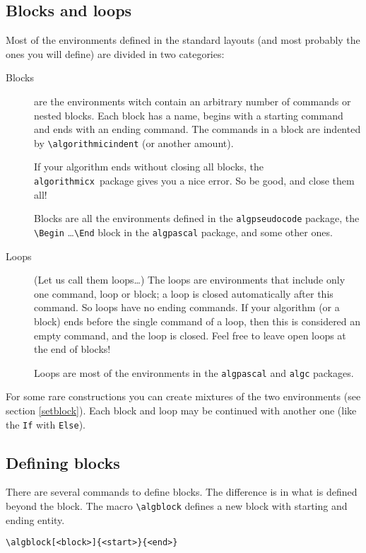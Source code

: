 \documentclass{article}
\newcommand{\alg}{\texttt{algorithmicx}}
\begin{document}
\begin{minipage}[b]{0.5\linewidth}
\begin{minipage}[b]{0.5\linewidth}
\begin{minipage}[b]{0.5\linewidth}
\begin{minipage}[b]{0.5\linewidth}
\begin{minipage}[b]{0.5\linewidth}
\begin{minipage}[b]{0.5\linewidth}
\begin{minipage}[b]{0.5\linewidth}
\subsection{Blocks and loops}

Most of the environments defined in the standard layouts (and most probably 
the ones you will define) are divided in two categories:

\begin{description}
\item[Blocks] are the environments witch contain an arbitrary number of 
commands or nested blocks. Each block has a name, begins with a starting command 
and ends with an ending command. The commands in a block are 
indented by \verb:\algorithmicindent: (or another amount).

If your algorithm ends without closing all blocks, the \alg\ package gives
you a nice error. So be good, and close them all!

Blocks are all the environments defined in the \verb:algpseudocode: 
package, the \verb:\Begin: \dots \verb:\End: block in the 
\verb:algpascal: package, and some other ones.
\item[Loops] (Let us call them loops\dots) The loops are environments 
that include only one command, loop or block; a loop is closed 
automatically after this command. So loops have no ending commands. If 
your algorithm (or a block) ends before the single command of a loop, 
then this is considered an empty command, and the loop is closed. Feel 
free to leave open loops at the end of blocks!

Loops are most of the environments in the \verb:algpascal: and 
\verb:algc: packages.
\end{description}

For some rare constructions you can create mixtures of the two 
environments (see section \ref{setblock}).
Each block and loop may be continued with another one (like the \verb:If: 
with \verb:Else:).

\subsection{Defining blocks}\label{defblocks}

There are several commands to define blocks. The difference is in what is defined
beyond the block. The macro \verb:\algblock: defines a new block with starting and
ending entity.

\begin{verbatim}
\algblock[<block>]{<start>}{<end>}
\end{verbatim}


\end{minipage}
\end{minipage}
\end{minipage}
\end{minipage}
\end{minipage}
\end{minipage}
\end{minipage}
\end{document}
